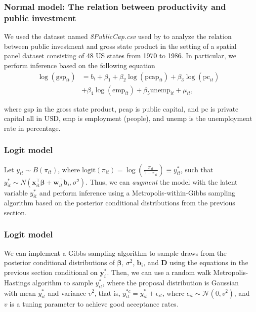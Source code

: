 \documentclass[12pt, compress]{beamer}
\begin{document}
\begin{frame}
	\frametitle{Normal model: The relation between productivity and public investment}
We used the dataset named \textit{8PublicCap.csv} used by \cite{Ramirez2017} to analyze the relation  between public investment and gross state product in the setting of a spatial panel dataset consisting of 48 US states from 1970 to 1986.
In particular, we perform inference based on the following equation 
\begin{align*}
\log(\text{gsp}_{it})&=b_i+\beta_1+\beta_2\log(\text{pcap}_{it})+\beta_3\log(\text{pc}_{it})\\
&+\beta_4\log(\text{emp}_{it})+\beta_5\text{unemp}_{it}+\mu_{it},
\end{align*}

where gsp in the gross state product, pcap is public capital, and pc is private capital all in USD, emp is employment (people), and unemp is the unemployment rate in percentage.
\end{frame}

\begin{frame}
	\frametitle{Logit model}
Let $y_{it} \sim B(\pi_{it})$, where $\text{logit}(\pi_{it}) = \log\left(\frac{\pi_{it}}{1 - \pi_{it}}\right) \equiv y_{it}^*$, such that $y_{it}^* \sim N(\bm{x}_{it}^{\top} \bm{\beta} + \bm{w}_{it}^{\top} \bm{b}_i, \sigma^2)$. Thus, we can \textit{augment} the model with the latent variable $y_{it}^*$ and perform inference using a Metropolis-within-Gibbs sampling algorithm based on the posterior conditional distributions from the previous section.
\end{frame}

\begin{frame}
	\frametitle{Logit model}
We can implement a Gibbs sampling algorithm to sample draws from the posterior conditional distributions of $\bm{\beta}$, $\sigma^2$, $\bm{b}_i$, and $\bm{D}$ using the equations in the previous section conditional on $\bm{y}_i^*$. Then, we can use a random walk Metropolis-Hastings algorithm to sample $y_{it}^*$, where the proposal distribution is Gaussian with mean $y_{it}^*$ and variance $v^2$, that is, $y_{it}^{*c} = y_{it}^* + \epsilon_{it}$, where $\epsilon_{it} \sim \mathcal{N}(0, v^2)$, and $v$ is a tuning parameter to achieve good acceptance rates. 

\end{frame}
\end{document}
